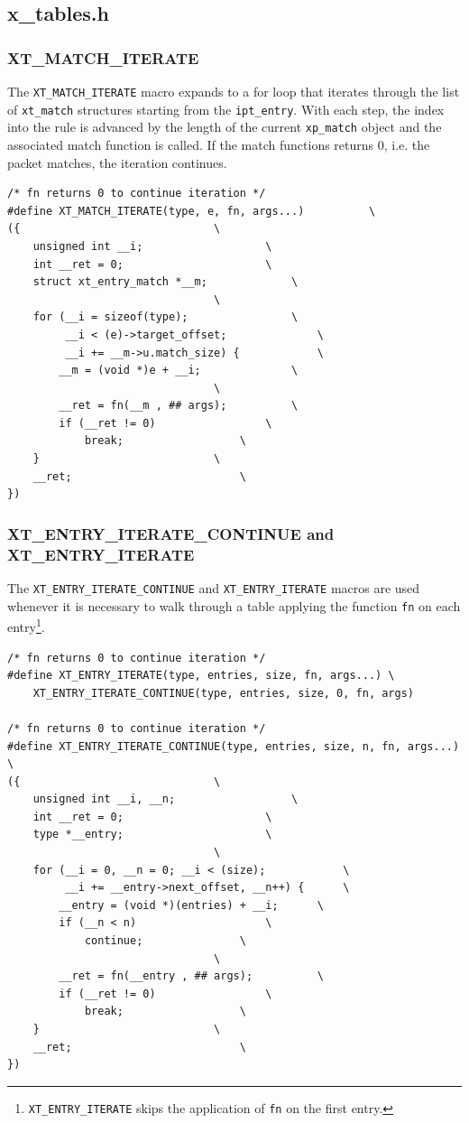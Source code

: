 \documentclass[a4paper,10pt]{article}
\newcommand{\code}[1]{\texttt{#1}}
\begin{document}
\subsection{x\_tables.h}

\subsubsection{XT\_MATCH\_ITERATE}

The \code{XT\_MATCH\_ITERATE} macro expands to a for loop that
iterates through the list of \code{xt\_match} structures starting from
the \code{ipt\_entry}. With each step, the index into the rule is
advanced by the length of the current \code{xp\_match} object and the
associated match function is called. If the match functions returns 0, i.e. the packet
matches, the iteration continues.


\begin{lstlisting}
/* fn returns 0 to continue iteration */
#define XT_MATCH_ITERATE(type, e, fn, args...)			\
({								\
	unsigned int __i;					\
	int __ret = 0;						\
	struct xt_entry_match *__m;				\
								\
	for (__i = sizeof(type);				\
	     __i < (e)->target_offset;				\
	     __i += __m->u.match_size) {			\
		__m = (void *)e + __i;				\
								\
		__ret = fn(__m , ## args);			\
		if (__ret != 0)					\
			break;					\
	}							\
	__ret;							\
})

\end{lstlisting}


\subsubsection{XT\_ENTRY\_ITERATE\_CONTINUE and XT\_ENTRY\_ITERATE}

The \code{XT\_ENTRY\_ITERATE\_CONTINUE} and \code{XT\_ENTRY\_ITERATE}
macros are used whenever it is necessary to walk through a table
applying the function \code{fn} on each
entry\footnote{\code{XT\_ENTRY\_ITERATE} skips the application of
  \code{fn} on the first entry.}.

\begin{lstlisting}
/* fn returns 0 to continue iteration */
#define XT_ENTRY_ITERATE(type, entries, size, fn, args...) \
	XT_ENTRY_ITERATE_CONTINUE(type, entries, size, 0, fn, args)

/* fn returns 0 to continue iteration */
#define XT_ENTRY_ITERATE_CONTINUE(type, entries, size, n, fn, args...) \
({								\
	unsigned int __i, __n;					\
	int __ret = 0;						\
	type *__entry;						\
								\
	for (__i = 0, __n = 0; __i < (size);			\
	     __i += __entry->next_offset, __n++) { 		\
		__entry = (void *)(entries) + __i;		\
		if (__n < n)					\
			continue;				\
								\
		__ret = fn(__entry , ## args);			\
		if (__ret != 0)					\
			break;					\
	}							\
	__ret;							\
})
\end{lstlisting}
\end{document}
